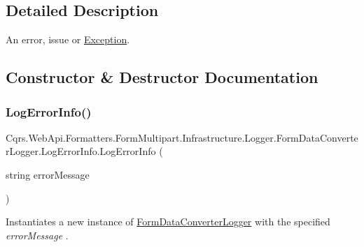 \subsection{Detailed Description}
An error, issue or \hyperlink{classCqrs_1_1WebApi_1_1Formatters_1_1FormMultipart_1_1Infrastructure_1_1Logger_1_1FormDataConverterLogger_1_1LogErrorInfo_aca090100f80122a6a5ae5aa930f49e9b_aca090100f80122a6a5ae5aa930f49e9b}{Exception}. 



\subsection{Constructor \& Destructor Documentation}
\mbox{\label{classCqrs_1_1WebApi_1_1Formatters_1_1FormMultipart_1_1Infrastructure_1_1Logger_1_1FormDataConverterLogger_1_1LogErrorInfo_a31916a55289297f7efaa60610ae7c709_a31916a55289297f7efaa60610ae7c709}} 
\subsubsection{\texorpdfstring{Log\+Error\+Info()}{LogErrorInfo()}\hspace{0.1cm}{\footnotesize\ttfamily [1/2]}}
{\footnotesize\ttfamily Cqrs.\+Web\+Api.\+Formatters.\+Form\+Multipart.\+Infrastructure.\+Logger.\+Form\+Data\+Converter\+Logger.\+Log\+Error\+Info.\+Log\+Error\+Info (\begin{DoxyParamCaption}\item[{string}]{error\+Message }\end{DoxyParamCaption})}



Instantiates a new instance of \hyperlink{classCqrs_1_1WebApi_1_1Formatters_1_1FormMultipart_1_1Infrastructure_1_1Logger_1_1FormDataConverterLogger}{Form\+Data\+Converter\+Logger} with the specified {\itshape error\+Message} . 

